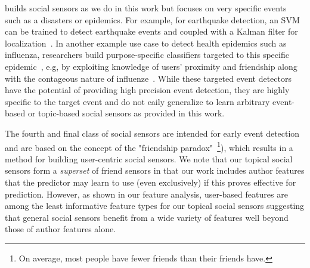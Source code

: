 \vspace{2mm}
 builds social sensors
as we do in this work but focuses on very specific events 
such as a disasters or epidemics.  For example, for earthquake
detection, an SVM can be trained to detect earthquake events
and coupled with a Kalman filter for localization~\cite{sakakiEq2}.
%
%
%
In another example use case to detect health epidemics such as
influenza, researchers build purpose-specific classifiers targeted to
this specific epidemic~\cite{culotta,aramaki}, e.g, by exploiting
knowledge of users' proximity and friendship along with the contageous
nature of influenze~\cite{sadilek}.  While these targeted event
detectors have the potential of providing high precision event
detection, they are highly specific to the target event and do not
eaily generalize to learn arbitrary event-based or topic-based social
sensors as provided in this work.

\vspace{2mm}
The fourth and final class of social sensors are intended for early
event detection~\cite{sandy,garcia} and are based on the concept of the
"friendship paradox"\cite{feld}~\footnote{On average, most people have
fewer friends than their friends have.}), which results in a method for
building user-centric social sensors.  We note that our topical social
sensors form a \emph{superset} of friend sensors in that our work
includes author features that the predictor may learn to use (even
exclusively) if this proves effective for prediction.  However, as
shown in our feature analysis, user-based features are among the least
informative feature types for our topical social sensors suggesting
that general social sensors benefit from a wide variety of features
well beyond those of author features alone.

